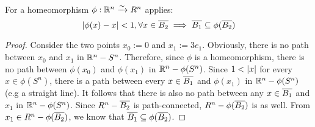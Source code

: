  \\
For a homeomorphism $\phi: \mathbb{R}^n \xrightarrow{\sim} R^n$ applies:
\[ \abs{\phi(x) - x} < 1, \forall x \in \clball[2] \implies \clball[1] \sub \phi(\clball[2]) \]
\begin{proof}
Consider the two points $x_0 := 0$ and $x_1 := 3e_1$.
Obviously, there is no path between $x_0$ and $x_1$ in $\mathbb{R}^n - S^n$.
Therefore, since $\phi$ is a homeomorphism, there is no path between $\phi(x_0)$ and $\phi(x_1)$ in $\mathbb{R}^n - \phi(S^n)$.
Since $1 < \vert{} x \vert{}$ for every $x \in\phi(S^n)$, there is a path between every $x \in \clball[1]$ and $\phi(x_1)$ in $\mathbb{R}^n - \phi(S^n)$ (e.g a straight line).
It follows that there is also no path between any $x \in \clball[1]$ and $x_1$ in $\mathbb{R}^n - \phi(S^n)$.
Since $R^n - \clball[2]$ is path-connected, $R^n - \phi(\clball[2])$ is as well. From $x_1 \in R^n - \phi(\clball[2])$, we know that $\clball[1] \sub \phi(\clball[2])$.
\end{proof}

